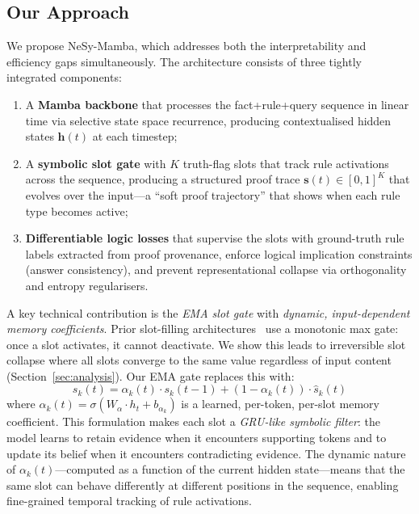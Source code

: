 \documentclass[conference]{IEEEtran}
\DeclareRobustCommand{\model}{NeSy-Mamba}
\begin{document}
\subsection{Our Approach}

We propose \model{}, which addresses both the interpretability and
efficiency gaps simultaneously.  The architecture consists of
three tightly integrated components:
\begin{enumerate}[nosep]
    \item A \textbf{Mamba backbone} that processes the
          fact+rule+query sequence in linear time via selective
          state space recurrence, producing contextualised hidden
          states $\mathbf{h}(t)$ at each timestep;
    \item A \textbf{symbolic slot gate} with $K$ truth-flag slots
          that track rule activations across the sequence, producing
          a structured proof trace
          $\mathbf{s}(t) \in [0,1]^K$ that evolves over the
          input---a ``soft proof trajectory'' that shows when each
          rule type becomes active;
    \item \textbf{Differentiable logic losses} that supervise the
          slots with ground-truth rule labels extracted from proof
          provenance, enforce logical implication constraints
          (answer consistency), and prevent representational
          collapse via orthogonality and entropy regularisers.
\end{enumerate}

A key technical contribution is the \emph{EMA slot gate} with
\emph{dynamic, input-dependent memory coefficients}.  Prior
slot-filling architectures~\cite{bao2022slot} use a monotonic
max gate: once a slot activates, it cannot deactivate.  We show
this leads to irreversible slot collapse where all slots converge
to the same value regardless of input content
(Section~\ref{sec:analysis}).
Our EMA gate replaces this with:
\begin{equation}
    s_k(t) = \alpha_k(t) \cdot s_k(t{-}1) + (1 - \alpha_k(t)) \cdot \hat{s}_k(t)
\label{eq:ema_intro}
\end{equation}
where $\alpha_k(t) = \sigma(W_\alpha \cdot h_t + b_{\alpha_k})$
is a learned, per-token, per-slot memory coefficient.  This
formulation makes each slot a \emph{GRU-like symbolic filter}:
the model learns to retain evidence when it encounters supporting
tokens and to update its belief when it encounters contradicting
evidence.  The dynamic nature of $\alpha_k(t)$---computed as a
function of the current hidden state---means that the same slot
can behave differently at different positions in the sequence,
enabling fine-grained temporal tracking of rule activations.
\end{document}
